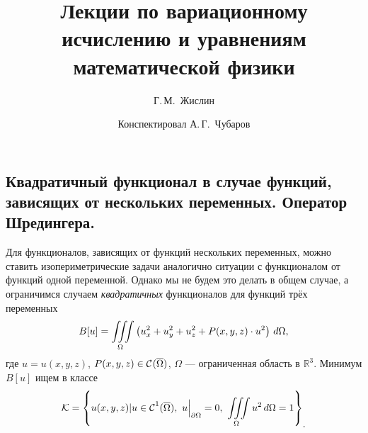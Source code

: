 \documentclass[12pt,a4paper,openany,fleqn]{book}
\newcommand{\R}{\ensuremath{\mathbb{R}}}
\newcommand{\Cf}{\ensuremath{\mathcal{C}}}
\newcommand{\mc}[1]{\ensuremath{\mathcal{#1}}}
\newcommand{\Cfn}[2][]{\ensuremath{\Cf{\mathstrut}^{#2}_{#1}}}
\newcommand{\K}{\mc{K}}
\theoremstyle{definition}
\begin{document}
	\author{Г.\,М.~Жислин}
	\title{Лекции по вариационному исчислению и уравнениям математической физики}
	\date{Конспектировал А.\,Г.~Чубаров}
	
	
	
	\maketitle
	
	
	\renewcommand{\thepart}{\Asbuk{part}}
	\renewcommand{\thechapter}{\arabic{chapter}}
	\renewcommand{\thesection}{\arabic{section}}
	\renewcommand{\thesubsection}{\Roman{subsection}}
	\renewcommand{\thefootnote}{\roman{footnote}}
	\renewcommand{\phi}{\varphi}
	\renewcommand{\Re}{\ensuremath{\mc{R}e\,}}
	\renewcommand{\Im}{\ensuremath{\mc{I}m\,}}
	
	\setcounter{chapter}{9}
	\chapter{}
	\label{lecture10}
	\section[Квадратичный функционал. Оператор Шредингера.]{Квадратичный функционал в случае функций, зависящих от нескольких переменных. Оператор Шредингера.}
	\label{lecture10section1}
	Для функционалов, зависящих от функций нескольких переменных, можно ставить изопериметрические задачи аналогично ситуации с функционалом от функций одной переменной. Однако мы не будем это делать в общем случае, а ограничимся случаем \emph{квадратичных} функционалов для функций трёх переменных
	\begin{equation}\label{l10:eq:0}
		\hfill B[u]=\iiint\limits_{\Omega}\left(u_x^2+u_y^2+u_z^2+P(x,y,z)\cdot u^2\right)\,d\Omega,\hfill
	\end{equation}
	где $u=u(x,y,z)$, $P(x,y,z)\in\Cfn{}(\overline{\Omega})$, $\Omega$ --- ограниченная область в $\R^3$. Минимум $B[u]$ ищем в классе
	\begin{equation*}
		\hfill\K=\left\{u(x,y,z)|u\in\Cfn{1}(\overline{\Omega}),\ u\Big|_{\partial\Omega}=0,\ \iiint\limits_{\Omega}u^2\,d\Omega=1\right\}_{\displaystyle.}\hfill
	\end{equation*}
\end{document}
